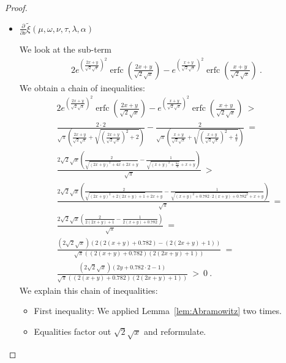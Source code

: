 \documentclass{article}
\newcommand\xinn{{\tilde \xi}}
\DeclareMathOperator{\erfc}{erfc}
\begin{document}
\begin{proof}
\begin{itemize}
\item $\frac{\partial }{\partial \nu } \xinn(\mu,\omega,\nu,\tau,\lambda ,\alpha )$

We look at the sub-term
\begin{align}
2 e^{\left(\frac{2 x+y}{\sqrt{2} \sqrt{x}}\right)^2}
  \erfc \left(\frac{2 x+y}{\sqrt{2}
  \sqrt{x}}\right)-e^{\left(\frac{x+y}{\sqrt{2} \sqrt{x}}\right)^2}
  \erfc \left(\frac{x+y}{\sqrt{2} \sqrt{x}}\right) \ .
\end{align}
We obtain a chain of inequalities:
\begin{align}
&2 e^{\left(\frac{2 x+y}{\sqrt{2} \sqrt{x}}\right)^2} \erfc \left(\frac{2 x+y}{\sqrt{2} \sqrt{x}}\right)-e^{\left(\frac{x+y}{\sqrt{2} \sqrt{x}}\right)^2} \erfc \left(\frac{x+y}{\sqrt{2} \sqrt{x}}\right)\ > \\ \nonumber
&\frac{2 \cdot 2}{\sqrt{\pi } \left(\frac{2 x+y}{\sqrt{2} \sqrt{x}}+\sqrt{\left(\frac{2 x+y}{\sqrt{2} \sqrt{x}}\right)^2+2}\right)}-\frac{2}{\sqrt{\pi } \left(\frac{x+y}{\sqrt{2} \sqrt{x}}+\sqrt{\left(\frac{x+y}{\sqrt{2} \sqrt{x}}\right)^2+\frac{4}{\pi }}\right)}\ = \\ \nonumber
&\frac{2 \sqrt{2}  \sqrt{x} \left(\frac{2}{\sqrt{(2 x+y)^2+4 x}+2 x+y}-\frac{1}{\sqrt{(x+y)^2+\frac{8 x}{\pi }}+x+y}\right)}{\sqrt{\pi }}\ > \\ \nonumber
&\frac{2 \sqrt{2}  \sqrt{x} \left(\frac{2}{\sqrt{(2 x+y)^2+2 (2
  x+y)+1}+2 x+y}-\frac{1}{\sqrt{(x+y)^2+0.782 \cdot 2
  (x+y)+0.782^2}+x+y}\right)}{\sqrt{\pi }}\ = \\ \nonumber
&\frac{2 \sqrt{2}  \sqrt{x}
  \left(\frac{2}{2 (2 x+y)+1}-\frac{1}{2
  (x+y)+0.782}\right)}{\sqrt{\pi }}\ = \\ \nonumber
&\frac{\left(2 \sqrt{2} 
  \sqrt{x}\right) (2 (2 (x+y)+0.782)-(2 (2 x+y)+1))}{\sqrt{\pi } ((2
  (x+y)+0.782) (2 (2 x+y)+1))}\ = \\ \nonumber
&\frac{\left(2 \sqrt{2}  \sqrt{x}\right)
  (2 y+0.782 \cdot 2-1)}{\sqrt{\pi } ((2 (x+y)+0.782) (2 (2 x+y)+1))} \ > \
  0 \ .
\end{align}
We explain this chain of inequalities:
\begin{itemize}
\item First inequality: We applied Lemma~\ref{lem:Abramowitz} two times.

\item Equalities factor out $\sqrt{2} \sqrt{x}$ and reformulate.


\end{itemize}
\end{itemize}
\end{proof}
\end{document}
